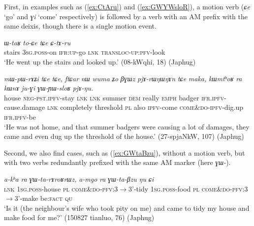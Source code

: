 \documentclass[oneside,a4paper,11pt]{article}
\newcommand{\ipa}[1]{{\phon\textit{#1}}}
\newcommand{\forme}[1]{\textit{\phon#1}}
\newcommand{\japhug}[2]{\textit{\phon#1} `#2'}
\newcommand{\rouge}[1]{{\color{red}#1}}
\begin{document}
First, in examples such as (\ref{ex:CtAru}) and (\ref{ex:GWYWsloR}), a motion verb (\japhug{ɕe}{go} and \japhug{ɣi}{come} respectively) is followed by a verb with an AM prefix with the same deixis, though there is a single motion event.

\begin{exe}
\ex \label{ex:CtAru}
\gll \ipa{tɕʰi}	\ipa{ɯ-taʁ}	\ipa{to-ɕe}	\ipa{tɕe}	\ipa{\rouge{ɕ}-tɤ-ru}   \\
stairs \textsc{3sg}.\textsc{poss}-on \textsc{ifr}:\textsc{up}-go \textsc{lnk}  \rouge{\textsc{transloc}}-\textsc{up}:\textsc{pfv}-look \\
\glt `He went up the stairs and looked up.'  (08-kWqhi, 18) (Japhug)
\end{exe}

\begin{exe}
\ex \label{ex:GWYWsloR}
\gll \ipa{kʰa}	\ipa{mɯ-pɯ-rɤʑi}	\ipa{tɕe}	\ipa{tɕe,}	\ipa{ftɕar}	\ipa{nɯ}	\ipa{wuma}	\ipa{ʑo}	\ipa{βɣɯz}	\ipa{pjɤ-rɯŋɯŋɤn}	\ipa{tɕe}	\ipa{maka,}	\ipa{kɯmtʰoʁ}	\ipa{ra}	\ipa{kɯnɤ}	\ipa{ju-ɣi}	\ipa{\rouge{ɣɯ}-ɲɯ-sloʁ}	\ipa{pjɤ-ŋu.} \\
house \textsc{neg}-\textsc{pst}.\textsc{ipfv}-stay \textsc{lnk} \textsc{lnk} summer \textsc{dem} really \textsc{emph} badger \textsc{ifr}.\textsc{ipfv}-cause.damage \textsc{lnk} completely threshold \textsc{pl} also \textsc{ipfv}-come \rouge{\textsc{come\&do}}-\textsc{ipfv}-dig.up \textsc{ifr}.\textsc{ipfv}-be \\
\glt `He was not home, and that summer badgers were causing a lot of damages, they came and even dug up  the threshold of the house.'  (27-spjaNkW, 107) (Japhug)
\end{exe}

Second, we also find cases, such as (\ref{ex:GWtaBzu}), without a motion verb, but with two verbs redundantly prefixed with the same AM marker (here \forme{ɣɯ-}).

\begin{exe}
\ex \label{ex:GWtaBzu}
\gll \ipa{tɕe}	\ipa{a-kʰa}	\ipa{ra}	\ipa{\rouge{ɣɯ}-ta-rɤroʁrɯz,}	\ipa{a-mgo}	\ipa{ra}	\ipa{\rouge{ɣɯ}-ta-βzu}	\ipa{ŋu}	\ipa{ɕi} \\
\textsc{lnk} \textsc{1sg}.\textsc{poss}-house \textsc{pl} \rouge{\textsc{come\&do}}-\textsc{pfv}:3$\rightarrow$3'-tidy 
 \textsc{1sg}.\textsc{poss}-food \textsc{pl} \rouge{\textsc{come\&do}}-\textsc{pfv}:3$\rightarrow$3'-make be:\textsc{fact} \textsc{qu} \\ 
\glt `Is it (the neighbour's wife who took pity on me) and came to tidy my house and make food for me?'  (150827 tianluo, 76) (Japhug)
\end{exe}
\end{document}
